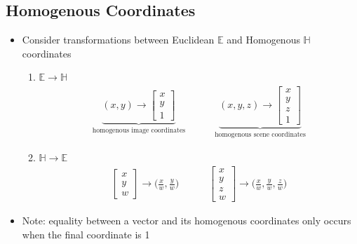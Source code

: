 \documentclass[letterpaper,12pt]{article}
\newcommand{\lra}{\ensuremath{\longrightarrow{}}}
\begin{document}
\subsection{Homogenous Coordinates}
\begin{itemize}
 \item Consider transformations between Euclidean $\mathbb{E}$ and Homogenous $\mathbb{H}$ coordinates
       \begin{enumerate}
        \item $\mathbb{E} \lra \mathbb{H}$
              \begin{align}
               \underbrace{(x,y) \lra \begin{bmatrix}
                 x \\
                 y \\
                 1
                \end{bmatrix}}_\text{homogenous image coordinates}
               \quad\quad\quad
               \underbrace{(x,y,z) \lra \begin{bmatrix}
                 x \\
                 y \\
                 z \\
                 1
                \end{bmatrix}}_\text{homogenous scene coordinates}
              \end{align}
        \item $\mathbb{H} \lra \mathbb{E}$
              \begin{align}
               \begin{bmatrix}
                x \\
                y \\
                w
               \end{bmatrix}
               \lra \bigg(\frac{x}{w}, \frac{y}{w}\bigg)
               \quad\quad\quad
               \begin{bmatrix}
                x \\
                y \\
                z \\
                w
               \end{bmatrix}
               \lra \bigg(\frac{x}{w}, \frac{y}{w}, \frac{z}{w}\bigg)
              \end{align}
       \end{enumerate}
 \item Note: equality between a vector and its homogenous coordinates only occurs when the final coordinate is 1
\end{itemize}
\end{document}

